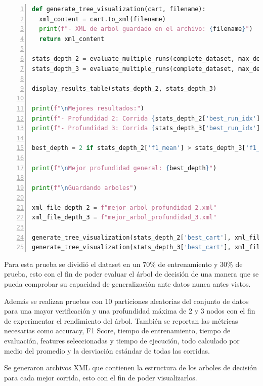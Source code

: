 \documentclass[12pt,a4paper]{article}
\begin{document}
\begin{lstlisting}[language=Python, numbers=left, basicstyle=\ttfamily\tiny,label={lst:lstlisting10}]
def generate_tree_visualization(cart, filename):
  xml_content = cart.to_xml(filename)
  print(f"- XML de arbol guardado en el archivo: {filename}")
  return xml_content

stats_depth_2 = evaluate_multiple_runs(complete_dataset, max_depth=2, n_runs=10, min_observations=2)
stats_depth_3 = evaluate_multiple_runs(complete_dataset, max_depth=3, n_runs=10, min_observations=2)

display_results_table(stats_depth_2, stats_depth_3)

print(f"\nMejores resultados:")
print(f"- Profundidad 2: Corrida {stats_depth_2['best_run_idx'] + 1} (F1-Score: {stats_depth_2['f1_mean']})")
print(f"- Profundidad 3: Corrida {stats_depth_3['best_run_idx'] + 1} (F1-Score: {stats_depth_3['f1_mean']})")

best_depth = 2 if stats_depth_2['f1_mean'] > stats_depth_3['f1_mean'] else 3

print(f"\nMejor profundidad general: {best_depth}")

print(f"\nGuardando arboles")

xml_file_depth_2 = f"mejor_arbol_profundidad_2.xml"
xml_file_depth_3 = f"mejor_arbol_profundidad_3.xml"

generate_tree_visualization(stats_depth_2['best_cart'], xml_file_depth_2)
generate_tree_visualization(stats_depth_3['best_cart'], xml_file_depth_3)
\end{lstlisting}

Para esta prueba se dividió el dataset en un 70\% de entrenamiento y 30\% de prueba, esto con el fin de poder
evaluar el árbol de decisión de una manera que se pueda comprobar su capacidad de generalización ante datos nunca antes vistos.

Además se realizan pruebas con 10 particiones aleatorias del conjunto de datos para una mayor verificación y una profundidad máxima de 2 y 3 nodos
con el fin de experimentar el rendimiento del árbol.
También se reportan las métricas necesarias como accuracy, F1 Score, tiempo de entrenamiento,
tiempo de evaluación, features seleccionadas y tiempo de ejecución, todo calculado por medio del promedio y la desviación estándar de todas las corridas.

Se generaron archivos XML que contienen la estructura de los arboles de decisión para cada mejor corrida, esto con el fin de poder visualizarlos.
\end{document}
